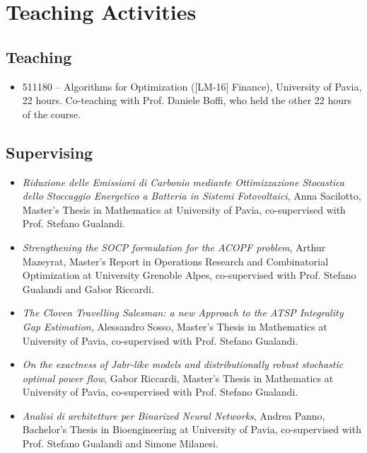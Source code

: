 \documentclass[11pt,a4paper]{article}
\begin{document}
\section*{Teaching Activities}
\subsection*{Teaching}
\begin{itemize}[noitemsep, labelwidth=*,align=left, labelwidth=!]
    \item[\texttt{2024/2025}] 511180 -- Algorithms for Optimization ([LM-16] Finance), University of Pavia, 22 hours. Co-teaching with Prof. Daniele Boffi, who held the other 22 hours of the course.
\end{itemize}
\subsection*{Supervising}
\begin{itemize}[labelwidth=*,align=left, labelwidth=!]
    \item[\texttt{2024/2025}] \emph{Riduzione delle Emissioni di Carbonio mediante Ottimizzazione Stocastica dello Stoccaggio Energetico a Batteria in Sistemi Fotovoltaici}, Anna Sacilotto, Master’s Thesis in Mathematics at University of Pavia, co-supervised with Prof. Stefano Gualandi.
    \item[\texttt{2024/2025}] \emph{Strengthening the SOCP formulation for the ACOPF problem}, Arthur Mazeyrat, Master's Report in Operations Research and Combinatorial Optimization at University Grenoble Alpes, co-supervised with Prof. Stefano Gualandi and Gabor Riccardi.
    \item[\texttt{2023/2024}] \emph{The Cloven Travelling Salesman: a new Approach to the ATSP Integrality Gap Estimation}, Alessandro Sosso, Master’s Thesis in Mathematics at University of Pavia, co-supervised with Prof. Stefano Gualandi.
    \item[\texttt{2022/2023}] \emph{On the exactness of Jabr-like models and distributionally robust stochastic optimal power flow}, Gabor Riccardi, Master’s Thesis in Mathematics at University of Pavia, co-supervised with Prof. Stefano Gualandi.
    \item[\texttt{2022/2023}] \emph{Analisi di architetture per Binarized Neural Networks}, Andrea Panno, Bachelor’s Thesis in Bioengineering at University of Pavia, co-supervised with Prof. Stefano Gualandi and Simone Milanesi.
\end{itemize}
\end{document}
